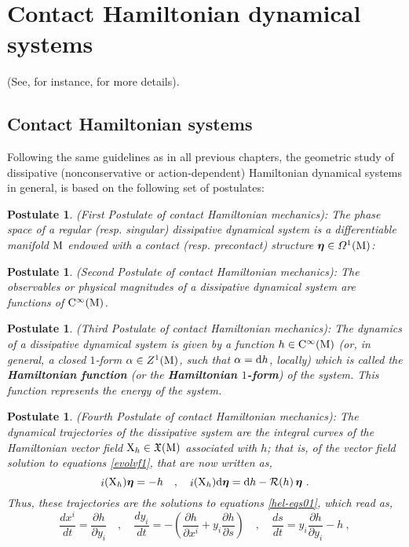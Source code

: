\documentclass[12pt]{report}
\newtheorem{pos}[teor]{Postulate}
\def\beq{\begin{equation}}
\def\eeq{\end{equation}}
\def\dst{\displaystyle}
\def\vf{\mathfrak X}
\def\df{{\mit\Omega}}
\def\d{{\rm d}}
\def\bmeta{\mbox{\boldmath $\eta$}}
\def\X{{\rm X}}
\def\inn{\mathop{i}\nolimits}
\def\Cinfty{{\rm C}^\infty}
\newcommand{\Reeb}{\mathcal{R}}
\begin{document}
\section{Contact Hamiltonian dynamical systems}
\label{chs}


(See, for instance, \cite{BCT-2017,CIAGLIA2018,DeLeon2019,GGMRR-2019b,Go-69,LL-2018}  for more details).


\subsection{Contact Hamiltonian systems}
\label{nasposcon}


Following the same guidelines as in all previous chapters,
the geometric study of dissipative (nonconservative or action-dependent) Hamiltonian dynamical systems
in general, is based on the following set of postulates:

\begin{pos}
{\rm (First Postulate of contact Hamiltonian mechanics\/)}:
The phase space of a regular (resp. singular)
dissipative dynamical system 
is a differentiable manifold ${\rm M}$ endowed with a contact 
(resp. precontact) structure $\bmeta\in\df^1({\rm M})$:
\label{axicon1}
\end{pos}

\begin{pos}
{\rm (Second Postulate of contact Hamiltonian mechanics\/)}:
The observables or physical magnitudes of a  dissipative dynamical system
are functions of $\Cinfty ({\rm M})$.
\label{axicon2}
\end{pos}

\begin{pos}
{\rm (Third Postulate of contact Hamiltonian mechanics\/)}:
The dynamics of a dissipative dynamical system
is given by a function $h\in\Cinfty({\rm M})$
(or, in general, a closed $1$-form $\alpha \in Z^1({\rm M})$, such that $\alpha=\d h$, locally)
which is called the {\sl \textbf{Hamiltonian function}}
(or  the {\sl \textbf{Hamiltonian $1$-form}}\/) of the system.
This function represents the energy of the system.
\label{axicon3}
\end{pos}

\begin{pos}
{\rm (Fourth Postulate of contact Hamiltonian mechanics\/)}:
The dynamical trajectories of the dissipative system are the integral curves
of the Hamiltonian vector field $\X_h\in\vf({\rm M})$ associated with $h$;
that is, of the vector field solution to equations \eqref{evolvf1}, that are now written as,
\beq
\inn(\X_h)\bmeta=-h \quad,\quad 
\inn(\X_h)\d\bmeta = \d h-\Reeb(h)\,\bmeta\ .
\label{evolvf111}
\eeq
Thus, these trajectories are the solutions to equations \eqref{hel-eqs01}, which read as,
\beq
\label{hel-eqs011}
\dst\frac{dx^i}{dt} = \frac{\partial h}{\partial y_i}\quad ,\quad
\dst\frac{dy_i}{dt} = -\left(\frac{\partial h}{\partial x^i} + y_i\frac{\partial h}{\partial s}\right)\quad , \quad
\dst\frac{ds}{dt} = y_i\frac{\partial h}{\partial y_i} - h \ , 
\eeq
\label{axicon4}
\end{pos}
\end{document}
